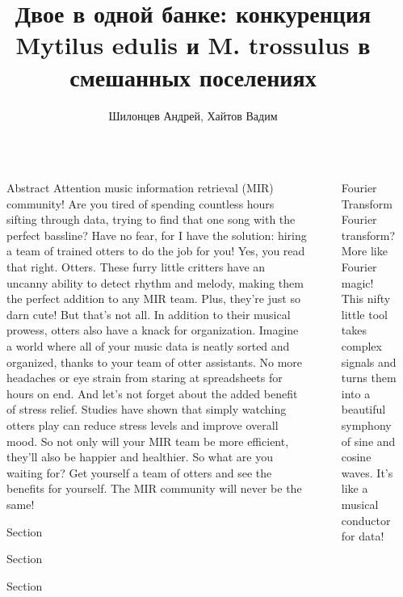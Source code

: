\documentclass[final]{beamer}
\title{Двое в одной банке: конкуренция Mytilus edulis и M. trossulus в смешанных поселениях}
\author{Шилонцев Андрей, Хайтов Вадим}
\institute[shortinst]{Music Informatics Group, Center for Music Technology, Georgia Institute of Technology}
\newlength{\sepwidth}
\newlength{\colwidth}
\newcommand{\separatorcolumn}{\begin{column}{\sepwidth}\end{column}}
\begin{document}
\begin{frame}[t]
\begin{columns}[t]
\separatorcolumn

\begin{column}{\colwidth}
    \begin{block}{Abstract}
        Attention music information retrieval (MIR) community! Are you tired of spending countless hours sifting through data, trying to find that one song with the perfect bassline? Have no fear, for I have the solution: hiring a team of trained otters to do the job for you! Yes, you read that right. Otters. These furry little critters have an uncanny ability to detect rhythm and melody, making them the perfect addition to any MIR team. Plus, they're just so darn cute! But that's not all. In addition to their musical prowess, otters also have a knack for organization. Imagine a world where all of your music data is neatly sorted and organized, thanks to your team of otter assistants. No more headaches or eye strain from staring at spreadsheets for hours on end. And let's not forget about the added benefit of stress relief. Studies have shown that simply watching otters play can reduce stress levels and improve overall mood. So not only will your MIR team be more efficient, they'll also be happier and healthier. So what are you waiting for? Get yourself a team of otters and see the benefits for yourself. The MIR community will never be the same!
    \end{block}

    \begin{block}{Section}
        \lipsum[1]
    \end{block}

    \begin{block}{Section}
        \lipsum[1]
    \end{block}

    \begin{block}{Section}
        \lipsum[1]
    \end{block}
\end{column}

\separatorcolumn

\begin{column}{\colwidth}
    
    \begin{block}{Fourier Transform}
        Fourier transform? More like Fourier magic! This nifty little tool takes complex signals and turns them into a beautiful symphony of sine and cosine waves. It's like a musical conductor for data!
        

\end{block}
\end{column}
\end{columns}
\end{frame}
\end{document}
